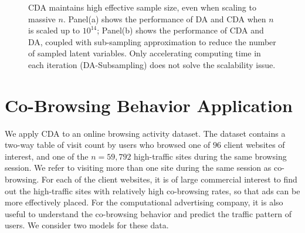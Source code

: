 \documentclass[11pt]{article}
\begin{document}
\begin{figure}[h]
  {\caption{CDA  maintains high effective sample size, even when scaling
 to massive $n$. Panel(a) shows the performance of DA and CDA when $n$ is scaled up to
 $10^{14}$; Panel(b) shows the performance of CDA and DA, coupled with sub-sampling
 approximation to reduce the number of sampled latent variables. Only accelerating computing time in each iteration (DA-Subsampling) does not solve the scalability issue.      \label{massive_n_sims}}}
  {%
    \qquad
  }
\end{figure}



 \section{Co-Browsing Behavior Application}

We apply CDA to an online browsing activity dataset. The dataset contains a two-way  table of visit count by users who browsed one of $96$ client websites of interest, and one of the  $n=59,792$ high-traffic sites during the same browsing session. We refer to visiting more than one site during the same session as co-browsing. For each of the client websites, it is of large commercial interest to find out the high-traffic sites with relatively high co-browsing rates, so that ads can be more effectively placed. For the computational advertising company, it is also useful to understand the co-browsing behavior and predict the traffic pattern of users. We consider two models for these data.
\end{document}
